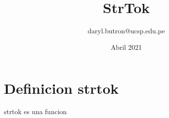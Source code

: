 \documentclass[11pt]{article}
\title{StrTok}
\author{daryl.butron@ucsp.edu.pe}
\date{Abril 2021}
\begin{document}
    \maketitle

    \section{Definicion strtok}
    strtok es una funcion
\end{document}
